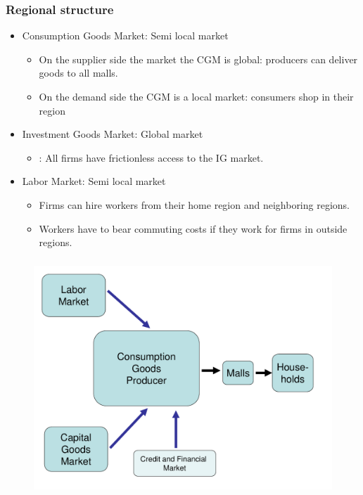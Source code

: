 \documentclass{beamer}
\begin{document}
\frame
{
  \frametitle{Regional structure} 
\begin{itemize}
	\item Consumption Goods Market: Semi local market
	
\begin{itemize}
	\item On the supplier side the market the CGM is global: producers can deliver goods
to all malls.
	\item On the demand side the CGM is a local market: consumers shop in their region
\end{itemize}

\item Investment Goods Market: Global market
\begin{itemize}
	\item : All firms have frictionless access to the IG market.
\end{itemize}
\item Labor Market: Semi local market
\begin{itemize}
	\item Firms can hire workers from their home region and neighboring regions.
	\item Workers have to bear commuting costs if they work for firms in outside regions. 
\end{itemize}


	
\end{itemize}
	

}




\frame
{
 \frametitle{} 
\begin{figure}
\centering
\includegraphics[scale=0.35]{CGP_Overview.pdf}
\label{fig:CGP_Overview}
\end{figure}


}
\end{document}
